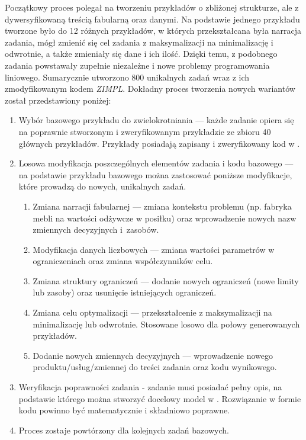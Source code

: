 Początkowy proces polegał na tworzeniu przykładów o zbliżonej strukturze, ale z dywersyfikowaną treścią fabularną oraz danymi. Na podstawie jednego przykładu tworzone było do 12 różnych przykładów, w których przekształcana była narracja zadania, mógł zmienić się cel zadania z maksymalizacji na minimalizację i odwrotnie, a także zmieniały się dane i ich ilość. Dzięki temu, z podobnego zadania powstawały zupełnie niezależne i nowe problemy programowania liniowego. Sumarycznie utworzono 800 unikalnych zadań wraz z ich zmodyfikowanym kodem  \textit{ZIMPL}.
Dokładny proces tworzenia nowych wariantów został przedstawiony poniżej:

\begin{enumerate}
\item Wybór bazowego przykładu do zwielokrotniania --- każde zadanie opiera się na poprawnie stworzonym i zweryfikowanym przykładzie ze zbioru 40 głównych przykładów. Przykłady posiadają zapisany i zweryfikowany kod w .
\item Losowa modyfikacja poszczególnych elementów zadania i kodu bazowego --- na podstawie przykładu bazowego można zastosować poniższe modyfikacje, które prowadzą do nowych, unikalnych zadań.
\begin{enumerate}
\item Zmiana narracji fabularnej --- zmiana kontekstu problemu (np. fabryka mebli na wartości odżywcze w posiłku) oraz wprowadzenie nowych nazw zmiennych decyzyjnych i~zasobów.
\item Modyfikacja danych liczbowych --- zmiana wartości parametrów w ograniczeniach oraz zmiana współczynników celu.
\item Zmiana struktury ograniczeń --- dodanie nowych ograniczeń (nowe limity lub zasoby) oraz usunięcie istniejących ograniczeń.
\item Zmiana celu optymalizacji --- przekształcenie z maksymalizacji na minimalizację lub odwrotnie. Stosowane losowo dla połowy generowanych przykładów.
\item Dodanie nowych zmiennych decyzyjnych --- wprowadzenie nowego produktu/usług/zmiennej do treści zadania oraz kodu wynikowego.
\end{enumerate}
\item Weryfikacja poprawności zadania - zadanie musi posiadać pełny opis, na podstawie którego można stworzyć docelowy model w . Rozwiązanie w formie kodu powinno być matematycznie i składniowo poprawne.
\item Proces zostaje powtórzony dla kolejnych zadań bazowych.
\end{enumerate}

